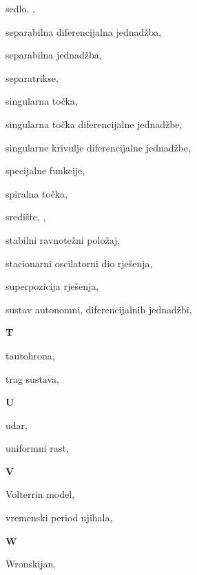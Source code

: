 \begin{theindex}
  \item sedlo, , 
  \item separabilna diferencijalna jednad\v zba, 
  \item separabilna jednad\v zba, 
  \item separatrikse, 
  \item singularna to\v cka, 
  \item singularna to\v cka diferencijalne jednad\v zbe, 
  \item singularne krivulje diferencijalne jednad\v zbe, 
  \item specijalne funkcije, 
  \item spiralna to\v cka, 
  \item sredi\v ste, , 
  \item stabilni ravnote\v zni polo\v zaj, 
  \item stacionarni oscilatorni dio rje\v senja, 
  \item superpozicija rje\v senja, 
  \item sustav
    \subitem autonomni, 
    \subitem diferencijalnih jednad\v zbi, 

  \indexspace
{\bfseries\hfil T\hfil}\nopagebreak

  \item tautohrona, 
  \item trag sustava, 

  \indexspace
{\bfseries\hfil U\hfil}\nopagebreak

  \item udar, 
  \item uniformni rast, 

  \indexspace
{\bfseries\hfil V\hfil}\nopagebreak

  \item Volterrin model, 
  \item vremenski period njihala, 

  \indexspace
{\bfseries\hfil W\hfil}\nopagebreak

  \item Wronskijan, 

\end{theindex}
